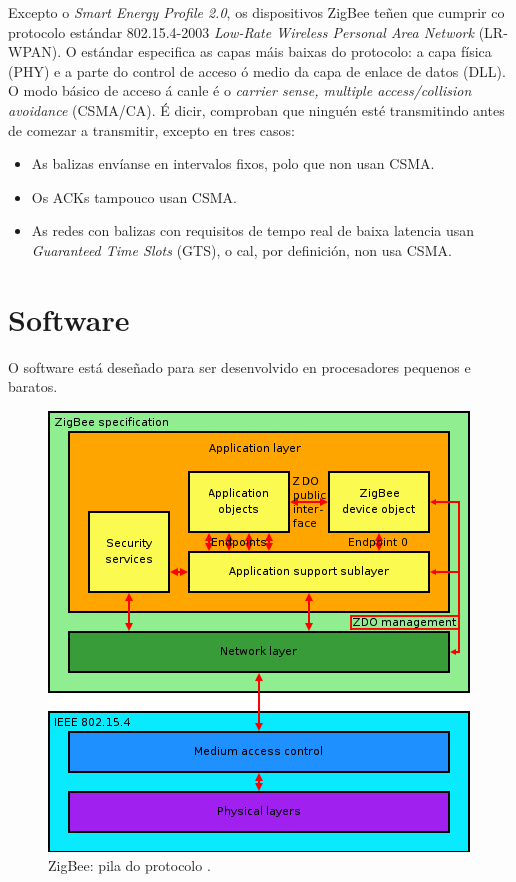 Excepto o \textit{Smart Energy Profile 2.0}, os dispositivos ZigBee teñen que
cumprir co protocolo estándar 802.15.4-2003
\textit{Low-Rate Wireless Personal Area Network} (LR-WPAN). O estándar
especifica as capas máis baixas do protocolo: a capa física (PHY) e a parte do
control de acceso ó medio da capa de enlace de datos (DLL). O modo básico de
acceso á canle é o \textit{carrier sense, multiple access/collision avoidance}
(CSMA/CA). É dicir, comproban que ninguén esté transmitindo antes de comezar a
transmitir, excepto en tres casos:

\begin{itemize}
 \item As balizas envíanse en intervalos fixos, polo que non usan CSMA.
 \item Os ACKs tampouco usan CSMA.
 \item As redes con balizas con requisitos de tempo real de baixa latencia usan
       \textit{Guaranteed Time Slots} (GTS), o cal, por definición, non usa
       CSMA.
\end{itemize}

\section{Software}

O software está deseñado para ser desenvolvido en procesadores pequenos e
baratos.

\begin{figure}[htbp]
 \centering
 \includegraphics[scale=0.6,keepaspectratio=true]{./imagenes/zigbee-pila-protocolo.png}
 \caption[ZigBee: pila do protocolo]{ZigBee: pila do protocolo \cite{ZigBeeProtocolStack}.}
 \label{figura:ZigBeePilaProtocolo}
\end{figure}

